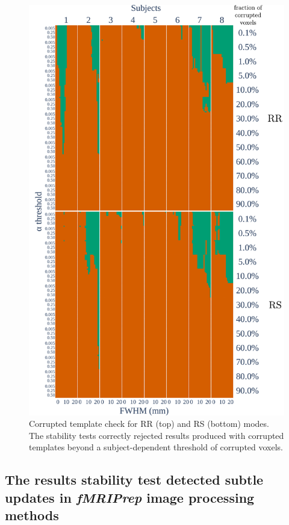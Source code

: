 \documentclass[lettersize,journal]{IEEEtran}
\newcommand{\fmriprep}{\emph{fMRIPrep}\xspace}
\begin{document}
{\begin{figure}
  \centering
  \includegraphics[width=\linewidth]{figures/template/template_fwe_bonferroni.pdf}
  \caption{Corrupted template check for RR (top) and RS (bottom) modes. The stability tests correctly rejected results produced with corrupted templates beyond a subject-dependent threshold of corrupted voxels.}
  \label{fig:template_bonferroni}
\end{figure}

\subsection{The results stability test detected subtle updates in \fmriprep image processing methods}

}
\end{document}
